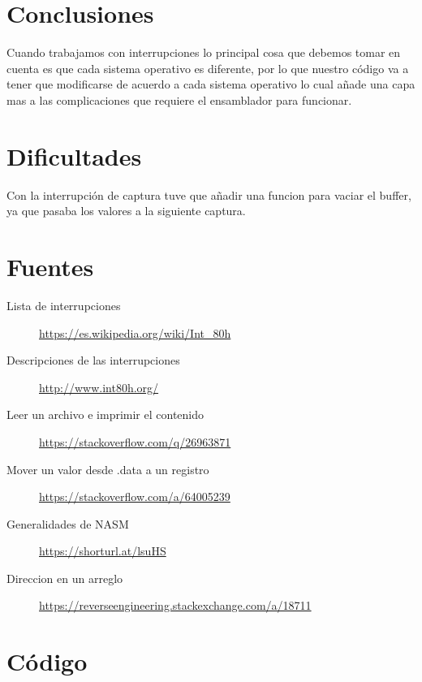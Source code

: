 \documentclass[12pt]{article}
\begin{document}
\section*{Conclusiones}
\label{sec:orgcfa519c}
Cuando trabajamos con interrupciones lo principal cosa que debemos tomar en cuenta
es que cada sistema operativo es diferente, por lo que nuestro código va a tener
que modificarse de acuerdo a cada sistema operativo lo cual añade una capa mas
a las complicaciones que requiere el ensamblador para funcionar.

\section*{Dificultades}
\label{sec:org985d790}
Con la interrupción de captura tuve que añadir una funcion para vaciar el 
buffer, ya que pasaba los valores a la siguiente captura.

\section*{Fuentes}
\label{sec:orgb7dcc6d}
\begin{description}
\item[{Lista de interrupciones}] \url{https://es.wikipedia.org/wiki/Int\_80h}
\item[{Descripciones de las interrupciones}] \url{http://www.int80h.org/}
\item[{Leer un archivo e imprimir el contenido}] \url{https://stackoverflow.com/q/26963871}
\item[{Mover un valor desde .data a un registro}] \url{https://stackoverflow.com/a/64005239}
\item[{Generalidades de NASM}] \url{https://shorturl.at/lsuHS}
\item[{Direccion en un arreglo}] \url{https://reverseengineering.stackexchange.com/a/18711}
\end{description}

\section*{Código}
\label{sec:orgb0d06d2}
\\ 
\end{document}
